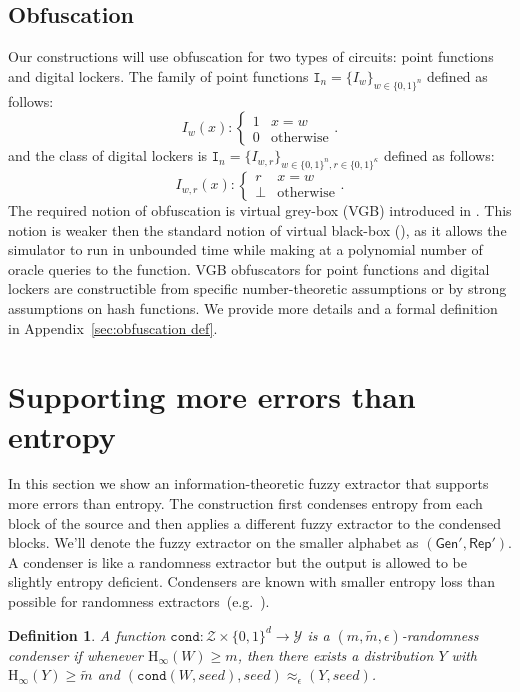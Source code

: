 \documentclass[11pt]{article}
\newcommand{\apref}[1]{\mbox{Appendix~\ref{#1}}}
\newcommand{\lemref}[1]{\mbox{Lemma~\ref{#1}}}
\newcommand{\class}[1]{{\ensuremath{\mathsf{#1}}}}
\newcommand{\gen}{\ensuremath{\class{Gen}}\xspace}
\newcommand{\rep}{\ensuremath{\class{Rep}}\xspace}
\newcommand{\zo}{\ensuremath{\{0, 1\}}}
\newcommand{\Hoo}{\mathrm{H}_\infty}
\newcommand{\cond}{\ensuremath{\mathtt{cond}}}
\newtheorem{definition}[theorem]{Definition}
\begin{document}
\subsection{Obfuscation}
Our constructions will use obfuscation for two types of circuits: point functions and digital lockers. The family of point functions $\mathtt{I}_n = \{I_w\}_{w \in \zo^n}$ defined as follows:
\[
I_w(x):\begin{cases} 1 & x=w\\0 & \text{otherwise}\end{cases}.
\]
and the class of digital lockers is $\mathtt{I}_n = \{I_{w, r}\}_{w \in \zo^n, r\in\zo^\kappa}$ defined as follows:
\[
I_{w, r}(x):\begin{cases} r & x=w\\\perp & \text{otherwise}\end{cases}.
\]
The required notion of obfuscation is virtual grey-box (VGB) introduced in \cite{bitansky2010strong}. This notion is weaker then the standard notion of virtual black-box (\cite{barak2001possibility}), as it allows the simulator to run in unbounded time while making at a polynomial number of oracle queries to the function. VGB obfuscators for point functions and digital lockers are constructible from specific number-theoretic assumptions or by strong assumptions on hash functions.  We provide more details and a formal definition in \apref{sec:obfuscation def}. 

\section{Supporting more errors than entropy}
\label{sec:info theory cons}
In this section we show an information-theoretic fuzzy extractor that supports more errors than entropy.
The construction first condenses entropy from each block of the source and then applies a different fuzzy extractor to the condensed blocks. We'll denote the fuzzy extractor on the smaller alphabet as $(\gen', \rep')$.  A condenser is like a randomness extractor but the output is allowed to be slightly entropy deficient.  Condensers are known with smaller entropy loss than possible for randomness extractors~(e.g.~\cite{dodis2014key}).  
\begin{definition}
\label{def:conductor}
A function $\cond : \mathcal{Z}\times \zo^d\rightarrow \mathcal{Y}$ is a $(m, \tilde{m}, \epsilon)$-randomness condenser if whenever $\Hoo(W)\ge m$, then there exists a distribution $Y$ with $\Hoo(Y)\ge \tilde{m}$ and $(\cond(W, seed), seed) \approx_\epsilon (Y, seed)$.
\end{definition}
\end{document}

